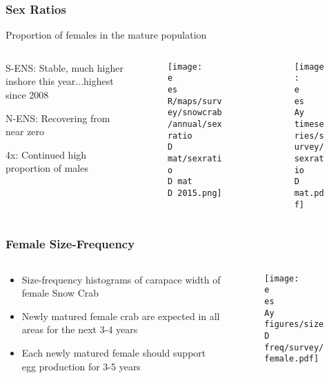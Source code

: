 \begin{frame}
\frametitle{Sex Ratios}
	\begin{center}
	Proportion of females in the mature population
	\end{center}
	
	\begin{columns}
	\begin{column}{0.3\textwidth}
	\begin{itemize}
	\end{itemize}
	\end{column}

	\begin{column}{0.35\textwidth}
	\begin{figure}
	\texttt{[image: \\e \\es R/maps/survey/snowcrab/annual/sexratio\\D mat/sexratio\\D mat\\D 2015.png]}
	\end{figure}
	\end{column}

	\begin{column}{0.35\textwidth}
	\begin{figure}
	 \texttt{[image: \\e \\es \\Ay timeseries/survey/sexratio\\D mat.pdf]}
	\end{figure}
	\end{column}
	\end{columns}
\end{frame}

\begin{frame}
\frametitle{Female Size-Frequency}
\begin{columns}
	\begin{column}{0.5\textwidth}
		\begin{itemize}
		\item Size-frequency histograms of carapace width of female Snow Crab
		\item Newly matured female crab are expected in all areas for the next 3-4 years
		\item Each newly matured female should support egg production for 3-5 years
		\end{itemize}
	\end{column}

	\begin{column}{0.5\textwidth}
	\begin{figure}
		\texttt{[image: \\e \\es \\Ay figures/size\\D freq/survey/female.pdf]}
	\end{figure}
	\end{column}
	\end{columns}
\end{frame}

